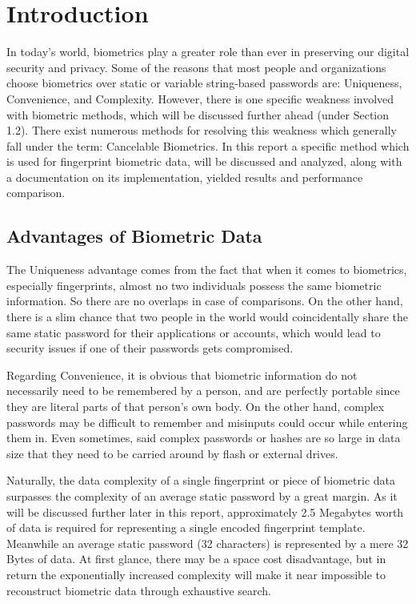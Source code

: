 \documentclass[fyp]{socreport}
\begin{document}
\tableofcontents 
\listoffigures
\listoftables

\chapter{Introduction}
In today's world, biometrics play a greater role than ever in preserving our digital security and privacy.  Some of the reasons that most people and organizations choose biometrics over static or variable string-based passwords are: Uniqueness, Convenience, and Complexity. However, there is one specific weakness involved with biometric methods, which will be discussed further ahead (under Section 1.2). There exist numerous methods for resolving this weakness which generally fall under the term: Cancelable Biometrics. In this report a specific method \cite{wencheng18cbio} which is used for fingerprint biometric data, will be discussed and analyzed, along with a documentation on its implementation, yielded results and performance comparison.
\section{Advantages of Biometric Data}
The Uniqueness advantage comes from the fact that when it comes to biometrics, especially fingerprints, almost no two individuals possess the same biometric information. So there are no overlaps in case of comparisons. On the other hand, there is a slim chance that two people in the world would coincidentally share the same static password for their applications or accounts, which would lead to security issues if one of their passwords gets compromised.

Regarding Convenience, it is obvious that biometric information do not necessarily need to be remembered by a person, and are perfectly portable since they are literal parts of that person's own body. On the other hand, complex passwords may be difficult to remember and misinputs could occur while entering them in. Even sometimes, said complex passwords or hashes are so large in data size that they need to be carried around by flash or external drives.

Naturally, the data complexity of a single fingerprint or piece of biometric data surpasses the complexity of an average static password by a great margin. As it will be discussed further later in this report, approximately 2.5 Megabytes worth of data is required for representing a single encoded fingerprint template. Meanwhile an average static password (32 characters) is represented by a mere 32 Bytes of data. At first glance, there may be a space cost disadvantage, but in return the exponentially increased complexity will make it near impossible to reconstruct biometric data through exhaustive search.
\end{document}
